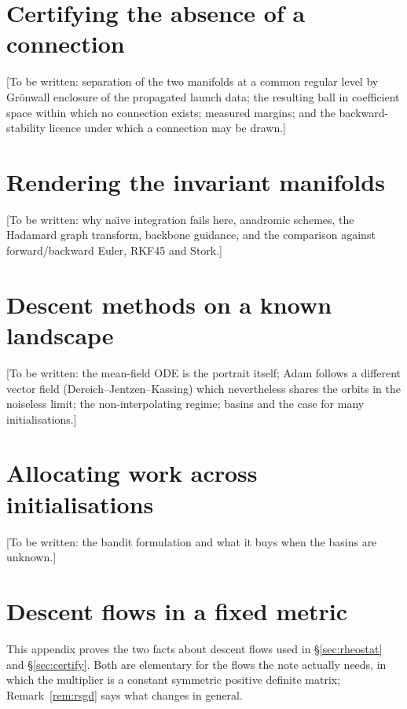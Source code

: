 \documentclass[11pt]{article}
\theoremstyle{plain}
\theoremstyle{definition}
\theoremstyle{remark}
\begin{document}
\section{Certifying the absence of a connection}

[To be written: separation of the two manifolds at a common regular level by
Gr\"onwall enclosure of the propagated launch data; the resulting ball in
coefficient space within which no connection exists; measured margins; and
the backward-stability licence under which a connection may be drawn.]

\section{Rendering the invariant manifolds}

[To be written: why na\"\i ve integration fails here, anadromic schemes, the
Hadamard graph transform, backbone guidance, and the comparison against
forward/backward Euler, RKF45 and Stork.]

\section{Descent methods on a known landscape}

[To be written: the mean-field ODE is the portrait itself; Adam follows a
different vector field (Dereich--Jentzen--Kassing) which nevertheless shares
the orbits in the noiseless limit; the non-interpolating regime; basins and
the case for many initialisations.]

\section{Allocating work across initialisations}

[To be written: the bandit formulation and what it buys when the basins are
unknown.]

\appendix

\section{Descent flows in a fixed metric}\label{app:rsgd}

This appendix proves the two facts about descent flows used in
\S\ref{sec:rheostat} and \S\ref{sec:certify}. Both are elementary for the
flows the note actually needs, in which the multiplier is a constant
symmetric positive definite matrix; Remark~\ref{rem:rsgd} says what changes
in general.
\end{document}
